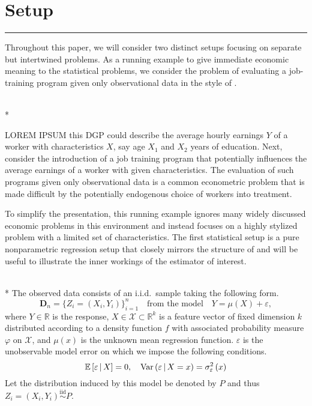 \section{Setup}\label{sec:setup}
\hrule
Throughout this paper, we will consider two distinct setups focusing on separate but intertwined problems.
As a running example to give immediate economic meaning to the statistical problems, we consider the problem of evaluating a job-training program given only observational data in the style of .
\begin{boxE}
	\begin{exmp}\label{asm:run_exmp}\mbox{}\\*
        
        {\color{red} LOREM IPSUM}
        this DGP could describe the average hourly earnings $Y$ of a worker with characteristics $X$, say age $X_1$ and $X_2$ years of education.
        Next, consider the introduction of a job training program that potentially influences the average earnings of a worker with given characteristics.
        The evaluation of such programs given only observational data is a common econometric problem that is made difficult by the potentially endogenous choice of workers into treatment.
	\end{exmp}
\end{boxE}
To simplify the presentation, this running example ignores many widely discussed economic problems in this environment and instead focuses on a highly stylized problem with a limited set of characteristics.
The first statistical setup is a pure nonparametric regression setup that closely mirrors the structure of \citet{demirkaya_optimal_2024} and will be useful to illustrate the inner workings of the estimator of interest.
\begin{boxD}
	\begin{asm}\label{asm:npr_dgp}\mbox{}\\*
		The observed data consists of an i.i.d.\ sample taking the following form.
		\begin{equation}\label{DGP1}
			\mathbf{D}_n = \{Z_{i} = (X_{i}, Y_{i})\}_{i = 1}^{n}
			\quad \text{from the model} \quad
			Y = \mu(X) + \varepsilon,
		\end{equation}
		where $Y \in \mathbb{R}$ is the response, $X \in \mathcal{X} \subset \mathbb{R}^k$ is a feature vector of fixed dimension $k$ distributed according to a density function $f$ with associated probability measure $\varphi$ on $\mathcal{X}$, and $\mu(x)$ is the unknown mean regression function.
		$\varepsilon$ is the unobservable model error on which we impose the following conditions.
		\begin{equation}
			\mathbb{E}\left[\varepsilon \, \middle| \, X\right] = 0, \quad
			\text{Var}\left(\varepsilon \, \middle| \, X = x\right) = \sigma_{\varepsilon}^2\left(x\right)
		\end{equation}
		Let the distribution induced by this model be denoted by $P$ and thus $Z_{i} = \left(X_{i}, Y_{i}\right) \overset{\text{iid}}{\sim} P$.
	\end{asm}
\end{boxD}
